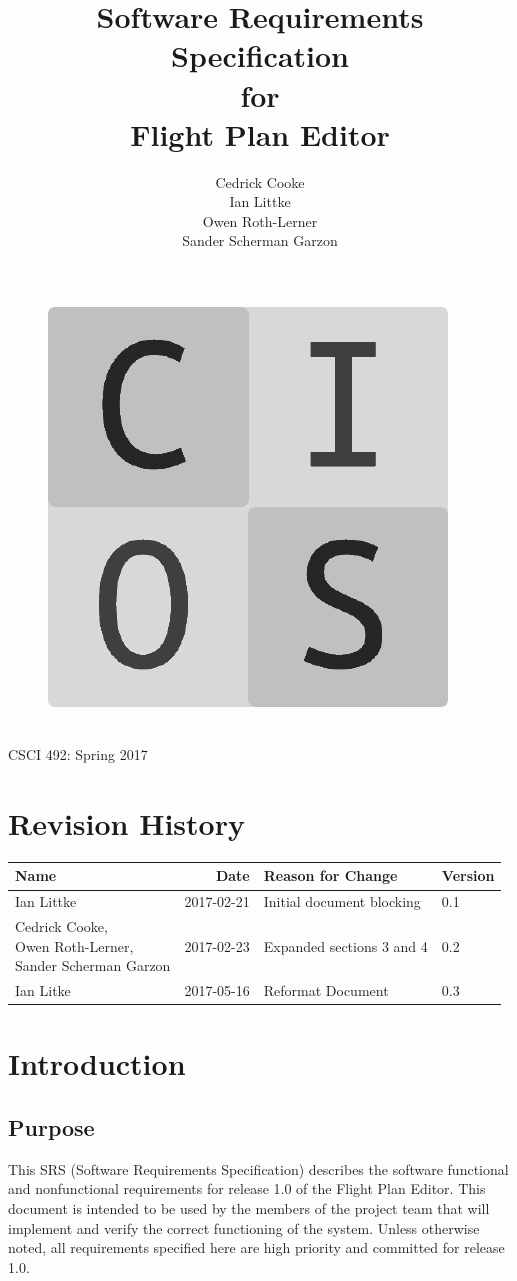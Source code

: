 \documentclass[12pt, letterpaper]{article}
\title{Software Requirements Specification\\for\\Flight Plan Editor}
\date{}
\author{
Cedrick Cooke\\
Ian Littke\\
Owen Roth-Lerner\\
Sander Scherman Garzon\\
}
\makeatletter
\renewcommand{\maketitle}{\bgroup\setlength{\parindent}{0pt}
\thispagestyle{empty}
\null
  \begin{flushleft}
  \vspace{15mm}
  \vskip2mm
  \Huge{\textbf{\@title}}
  \vspace{7cm}
\begin{figure}[ht]
  \begin{minipage}[b]{0.45\linewidth}
    \includegraphics[width=.75\textwidth]{images/cios.png}
  \end{minipage}
  \hspace{0.5cm}
  \begin{minipage}[b][][c]{0.45\linewidth}
    \LARGE{\@author}
  \vspace{0.35cm}
  \end{minipage}
\end{figure}
\\CSCI 492: Spring 2017\\
  \end{flushleft}\egroup
}
\makeatother
\begin{document}
\maketitle

\newpage
\pagestyle{style2}
\setcounter{page}{1}
\section*{Revision History}
\begin{tabularx}{\textwidth}{l r X l}
\textbf{Name} & \textbf{Date} & \textbf{Reason for Change} & \textbf{Version} \\
\hline
\hline
Ian Littke & 2017-02-21 & Initial document blocking & 0.1 \\
\makecell[cl]{Cedrick Cooke,\\ Owen Roth-Lerner,\\ Sander Scherman Garzon} & 2017-02-23 & Expanded sections 3 and 4 & 0.2 \\
Ian Litke & 2017-05-16 & Reformat Document & 0.3 \\
          \hline
\end{tabularx}

\newpage

\tableofcontents
\newpage
{}
\pagestyle{style1}
\setcounter{page}{1}

\section{Introduction}
  \subsection{Purpose}
    This SRS (Software Requirements Specification) describes the software functional and nonfunctional requirements
    for release 1.0 of the Flight Plan Editor.
    This document is intended to be used by the members of the project team that will implement
    and verify the correct functioning of the system.
    Unless otherwise noted, all requirements specified here are high priority
    and committed for release 1.0.
\end{document}
